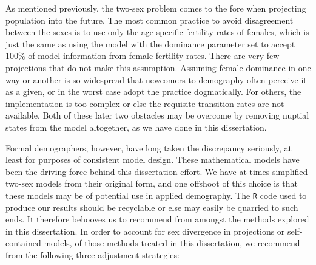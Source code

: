 As mentioned previously, the two-sex problem comes to the fore when projecting
population into the future. The most common practice to avoid disagreement between the sexes is to
use only the age-specific fertility rates of females, which is just the same as
using the \citet{goodman1967age} model with the dominance parameter set to
accept 100\% of model information from female fertility rates. There are
very few projections that do not make this assumption. Assuming female dominance
in one way or another is so widespread that newcomers to demography often perceive 
it as a given, or in the worst case adopt the
practice dogmatically. For others, the implementation is too complex or
else the requisite transition rates are not available. Both of these later
two obstacles may be overcome by removing nuptial states from the model
altogether, as we have done in this dissertation. 

Formal demographers, however, have long taken the discrepancy seriously, at
least for purposes of consistent model design. These mathematical models
have been the driving force behind this dissertation effort. We have at
times simplified two-sex models from their original form, and one offshoot of
this choice is that these models may be of potential use in applied demography.
The \texttt{R} code used to produce our results should be recyclable or else may
easily be quarried to such ends. It therefore behooves us to recommend from
amongst the methods explored in this dissertation. In order to account for sex
divergence in projections or self-contained models, of those methods treated in this dissertation, 
we recommend from the following three adjustment strategies:

